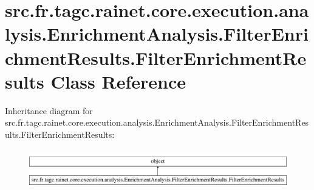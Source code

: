 \hypertarget{classsrc_1_1fr_1_1tagc_1_1rainet_1_1core_1_1execution_1_1analysis_1_1EnrichmentAnalysis_1_1Filte941a9d7a59dd1ff35f69bc40c53c882a}{\section{src.\-fr.\-tagc.\-rainet.\-core.\-execution.\-analysis.\-Enrichment\-Analysis.\-Filter\-Enrichment\-Results.\-Filter\-Enrichment\-Results Class Reference}
\label{classsrc_1_1fr_1_1tagc_1_1rainet_1_1core_1_1execution_1_1analysis_1_1EnrichmentAnalysis_1_1Filte941a9d7a59dd1ff35f69bc40c53c882a}
}
Inheritance diagram for src.\-fr.\-tagc.\-rainet.\-core.\-execution.\-analysis.\-Enrichment\-Analysis.\-Filter\-Enrichment\-Results.\-Filter\-Enrichment\-Results\-:\begin{figure}[H]
\begin{center}
\leavevmode
\includegraphics[height=1.750000cm]{classsrc_1_1fr_1_1tagc_1_1rainet_1_1core_1_1execution_1_1analysis_1_1EnrichmentAnalysis_1_1Filte941a9d7a59dd1ff35f69bc40c53c882a}
\end{center}
\end{figure}
